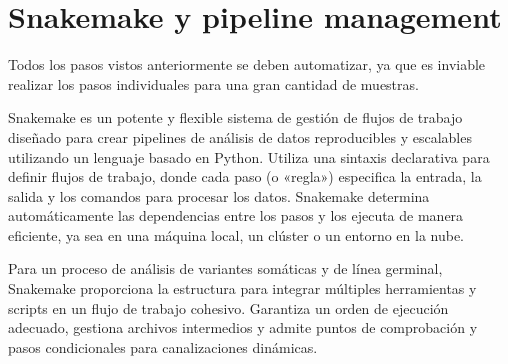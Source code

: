 \chapter{Snakemake y pipeline management}
Todos los pasos vistos anteriormente se deben automatizar, ya que es inviable realizar los pasos individuales para una gran cantidad de muestras.

Snakemake es un potente y flexible sistema de gestión de flujos de trabajo diseñado para crear pipelines de análisis de datos reproducibles y escalables utilizando un lenguaje basado en Python.
Utiliza una sintaxis declarativa para definir flujos de trabajo, donde cada paso (o «regla») especifica la entrada, la salida y los comandos para procesar los datos.
Snakemake determina automáticamente las dependencias entre los pasos y los ejecuta de manera eficiente, ya sea en una máquina local, un clúster o un entorno en la nube.

Para un proceso de análisis de variantes somáticas y de línea germinal, Snakemake proporciona la estructura para integrar múltiples herramientas y scripts en un flujo de trabajo cohesivo.
Garantiza un orden de ejecución adecuado, gestiona archivos intermedios y admite puntos de comprobación y pasos condicionales para canalizaciones dinámicas.

